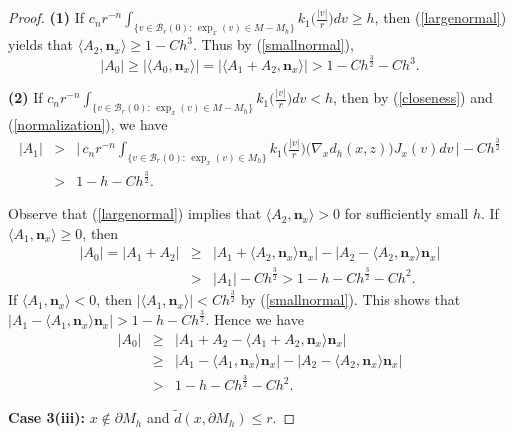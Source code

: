 \documentclass[11pt,letterpaper]{amsart}
\numberwithin{equation}{section}
\theoremstyle{definition}
\theoremstyle{plain}
\theoremstyle{definition}
\theoremstyle{plain}
\theoremstyle{definition}
\theoremstyle{plain}
\begin{document}
\begin{proof}
\smallskip
\textbf{(1)} If $c_{n}r^{-n} \int_{\{v\in \mathcal{B}_r(0): \,\exp_x(v)\in M-M_h\}}  k_1\big(\frac{|v|}{r}\big) dv \geqslant h$, then (\ref{largenormal}) yields that $\langle A_2,\textbf{n}_x \rangle \geqslant 1-Ch^{3}$.
Thus by (\ref{smallnormal}),
$$|A_0|\geqslant |\langle A_0,\textbf{n}_x \rangle| =|\langle A_1+A_2,\textbf{n}_x \rangle| > 1-Ch^{\frac{3}{2}}-Ch^{3}.$$

\textbf{(2)} If $c_{n}r^{-n} \int_{\{v\in \mathcal{B}_r(0): \,\exp_x(v)\in M-M_h\}}  k_1\big(\frac{|v|}{r}\big) dv < h$, then by (\ref{closeness}) and (\ref{normalization}), we have
\begin{eqnarray*}
|A_1| &>& \bigg| \, c_{n}r^{-n} \int_{\{v\in \mathcal{B}_r(0): \,\exp_x(v)\in M_h\}}  k_1\big(\frac{|v|}{r}\big) \big(\nabla_x d_h(x,z)\big) J_x(v) dv \, \bigg| - Ch^{\frac{3}{2}} \\
&>& 1-h-Ch^{\frac{3}{2}}. 
\end{eqnarray*}

Observe that (\ref{largenormal}) implies that $\langle A_2,\textbf{n}_x \rangle > 0$ for sufficiently small $h$. If $\langle A_1,\textbf{n}_x \rangle \geqslant 0$, then 
\begin{eqnarray*}
|A_0|=|A_1+A_2|&\geqslant& \big|A_1+\langle A_2,\textbf{n}_x \rangle \textbf{n}_x \big|-\big|A_2-\langle A_2,\textbf{n}_x \rangle \textbf{n}_x \big| \\
&>& |A_1|-Ch^{\frac{3}{2}} > 1-h-Ch^{\frac{3}{2}}-Ch^{2}.
\end{eqnarray*}
If $\langle A_1,\textbf{n}_x \rangle < 0$, then $|\langle A_1,\textbf{n}_x \rangle|<Ch^{\frac{3}{2}}$ by (\ref{smallnormal}). This shows that $\big|A_1-\langle A_1,\textbf{n}_x \rangle \textbf{n}_x \big|>1-h-Ch^{\frac{3}{2}}$. Hence we have 
\begin{eqnarray*}
|A_0|&\geqslant& \big|A_1+A_2-\langle A_1+A_2,\textbf{n}_x \rangle \textbf{n}_x \big| \\
&\geqslant& \big|A_1-\langle A_1,\textbf{n}_x \rangle \textbf{n}_x \big|- \big|A_2-\langle A_2,\textbf{n}_x \rangle \textbf{n}_x \big| \\
&>& 1-h-Ch^{\frac{3}{2}}-Ch^{2}.
\end{eqnarray*}

\smallskip
\textbf{Case 3(iii):} $x\notin \partial M_h$ and $\widetilde{d}(x,\partial M_h)\leqslant r$.


\end{proof}
\end{document}
